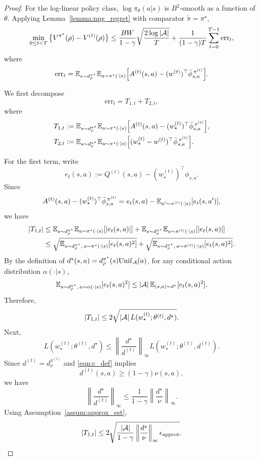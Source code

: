 \begin{proof}
For the log-linear policy class, $\log \pi_\theta(a|s)$ is $B^2$-smooth as a function of
$\theta$. Applying Lemma~\ref{lemma:npg_regret} with comparator $\widetilde\pi=\pi^\star$,
\[
\min_{0\le t<T}\big\{V^{\pi^\star}(\rho)-V^{(t)}(\rho)\big\}
\le
\frac{BW}{1-\gamma}\sqrt{\frac{2\log |\mathcal{A}|}{T}}
+
\frac{1}{(1-\gamma)T}\sum_{t=0}^{T-1}\mathrm{err}_t,
\]
where
\[
\mathrm{err}_t
=
\mathbb{E}_{s\sim d_\rho^{\pi^\star}}
\mathbb{E}_{a\sim \pi^\star(\cdot|s)}
\Big[
A^{(t)}(s,a)-(w^{(t)})^\top \bar \phi_{s,a}^{\,\pi^{(t)}}
\Big].
\]

We first decompose
\[
\mathrm{err}_t
=
T_{1,t}+T_{2,t},
\]
where
\begin{align*}
T_{1,t}
&:=
\mathbb{E}_{s\sim d_\rho^{\pi^\star}}
\mathbb{E}_{a\sim \pi^\star(\cdot|s)}
\Big[
A^{(t)}(s,a)-(w_\star^{(t)})^\top \bar \phi_{s,a}^{\,\pi^{(t)}}
\Big], \\
T_{2,t}
&:=
\mathbb{E}_{s\sim d_\rho^{\pi^\star}}
\mathbb{E}_{a\sim \pi^\star(\cdot|s)}
\Big[
(w_\star^{(t)}-w^{(t)})^\top \bar \phi_{s,a}^{\,\pi^{(t)}}
\Big].
\end{align*}

For the first term, write
\[
e_t(s,a)
:=
Q^{(t)}(s,a)-(w_\star^{(t)})^\top \phi_{s,a}.
\]
Since
\[
A^{(t)}(s,a)-(w_\star^{(t)})^\top \bar \phi_{s,a}^{\,\pi^{(t)}}
=
e_t(s,a)-\mathbb{E}_{a'\sim \pi^{(t)}(\cdot|s)}[e_t(s,a')],
\]
we have
\begin{align*}
|T_{1,t}|
&\le
\mathbb{E}_{s\sim d_\rho^{\pi^\star}}
\mathbb{E}_{a\sim \pi^\star(\cdot|s)}[|e_t(s,a)|]
+
\mathbb{E}_{s\sim d_\rho^{\pi^\star}}
\mathbb{E}_{a\sim \pi^{(t)}(\cdot|s)}[|e_t(s,a)|] \\
&\le
\sqrt{\mathbb{E}_{s\sim d_\rho^{\pi^\star},\,a\sim \pi^\star(\cdot|s)}[e_t(s,a)^2]}
+
\sqrt{\mathbb{E}_{s\sim d_\rho^{\pi^\star},\,a\sim \pi^{(t)}(\cdot|s)}[e_t(s,a)^2]}.
\end{align*}
By the definition of $d^\star(s,a)=d_\rho^{\pi^\star}(s)\mathrm{Unif}_{\mathcal{A}}(a)$,
for any conditional action distribution $\alpha(\cdot|s)$,
\[
\mathbb{E}_{s\sim d_\rho^{\pi^\star},\,a\sim \alpha(\cdot|s)}[e_t(s,a)^2]
\le
|\mathcal{A}|\,\mathbb{E}_{(s,a)\sim d^\star}[e_t(s,a)^2].
\]
Therefore,
\[
|T_{1,t}|
\le
2\sqrt{|\mathcal{A}|\,L(w_\star^{(t)};\theta^{(t)},d^\star)}.
\]
Next,
\[
L(w_\star^{(t)};\theta^{(t)},d^\star)
\le
\left\|\frac{d^\star}{d^{(t)}}\right\|_\infty
L(w_\star^{(t)};\theta^{(t)},d^{(t)}).
\]
Since $d^{(t)}=d_\nu^{\pi^{(t)}}$ and \eqref{eqn:c_def} implies
\[
d^{(t)}(s,a)\ge (1-\gamma)\nu(s,a),
\]
we have
\[
\left\|\frac{d^\star}{d^{(t)}}\right\|_\infty
\le
\frac{1}{1-\gamma}\left\|\frac{d^\star}{\nu}\right\|_\infty.
\]
Using Assumption~\ref{assum:approx_est},
\[
|T_{1,t}|
\le
2\sqrt{\frac{|\mathcal{A}|}{1-\gamma}\left\|\frac{d^\star}{\nu}\right\|_\infty \epsilon_{\mathrm{approx}}}.
\]


\end{proof}
